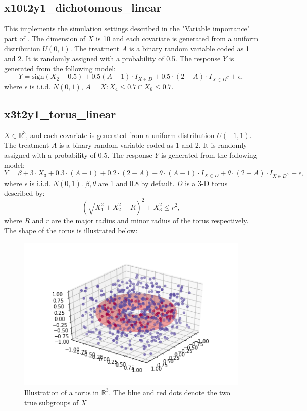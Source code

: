 \documentclass[12pt]{article}
\begin{document}
\subsection*{x10t2y1\_dichotomous\_linear}
This implements the simulation settings described in the "Variable importance" part of \cite{fu2016estimating}. The dimension of $X$ is 10 and each covariate is generated from a uniform distribution $U(0,1)$. The treatment $A$ is a binary random variable coded as 1 and 2. It is randomly assigned with a probability of 0.5. The response $Y$ is generated from the following model:
\begin{equation*}
Y=\text{sign}(X_2-0.5)+0.5(A-1)\cdot I_{X\in D}+0.5\cdot(2-A)\cdot I_{X\in D^C}+\epsilon,
\end{equation*}
where $\epsilon$ is i.i.d. $N(0,1)$, $A={X:X_4\le 0.7\cap X_6 \le 0.7}$.

\subsection*{x3t2y1\_torus\_linear}
$X\in \mathbb{R}^3$, and each covariate is generated from a uniform distribution $U(-1,1)$. The treatment $A$ is a binary random variable coded as 1 and 2. It is randomly assigned with a probability of 0.5. The response $Y$ is generated from the following model:
\begin{equation*}
Y= \beta + 3\cdot X_3 + 0.3 \cdot (A-1) + 0.2 \cdot (2-A) +
	\theta \cdot (A-1)\cdot I_{X\in D} + \theta \cdot (2-A) \cdot I_{X\in D^C}+\epsilon,
\end{equation*}
where $\epsilon$ is i.i.d. $N(0,1)$. $\beta, \theta$ are 1 and 0.8 by default. $D$ is a 3-D torus described by:
\begin{equation*}
(\sqrt{X_1^2+X_2^2}-R)^2+X_3^2\le r^2,
\end{equation*}
where $R$ and $r$ are the major radius and minor radius of the torus respectively. The shape of the torus is illustrated below:
\begin{figure}
	\centering
	\includegraphics[width=0.7\linewidth]{donut_shape}
	\caption{Illustration of a torus in $\mathbb{R}^3$. The blue and red dots denote the two true subgroups of $X$}
\end{figure}
\end{document}
